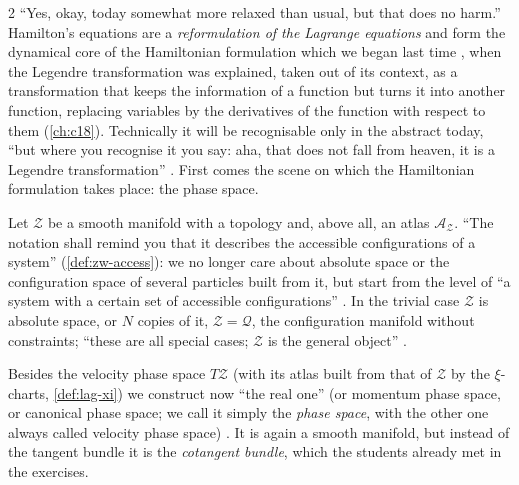 \begin{paracol}{2}
``Yes, okay, today somewhat more relaxed than usual, but that does no harm.'' Hamilton's equations are a \emph{reformulation of the Lagrange equations} and form the dynamical core of the Hamiltonian formulation which we began last time , when the Legendre transformation was explained, taken out of its context, as a transformation that keeps the information of a function but turns it into another function, replacing variables by the derivatives of the function with respect to them (\cref{ch:c18}). Technically it will be recognisable only in the abstract today, ``but where you recognise it you say: aha, that does not fall from heaven, it is a Legendre transformation'' . First comes the scene on which the Hamiltonian formulation takes place: the phase space.

Let $\mathcal Z$ be a smooth manifold with a topology and, above all, an atlas $\mathcal A_{\mathcal Z}$. ``The notation shall remind you that it describes the accessible configurations of a system'' (\cref{def:zw-access}): we no longer care about absolute space or the configuration space of several particles built from it, but start from the level of ``a system with a certain set of accessible configurations'' . In the trivial case $\mathcal Z$ is absolute space, or $N$ copies of it, $\mathcal Z=\mathcal Q$, the configuration manifold without constraints; ``these are all special cases; $\mathcal Z$ is the general object'' .

Besides the velocity phase space $T\mathcal Z$ (with its atlas built from that of $\mathcal Z$ by the $\xi$-charts, \cref{def:lag-xi}) we construct now ``the real one'' (or momentum phase space, or canonical phase space; we call it simply the \emph{phase space}, with the other one always called velocity phase space) . It is again a smooth manifold, but instead of the tangent bundle it is the \emph{cotangent bundle}, which the students already met in the exercises.


\end{paracol}
